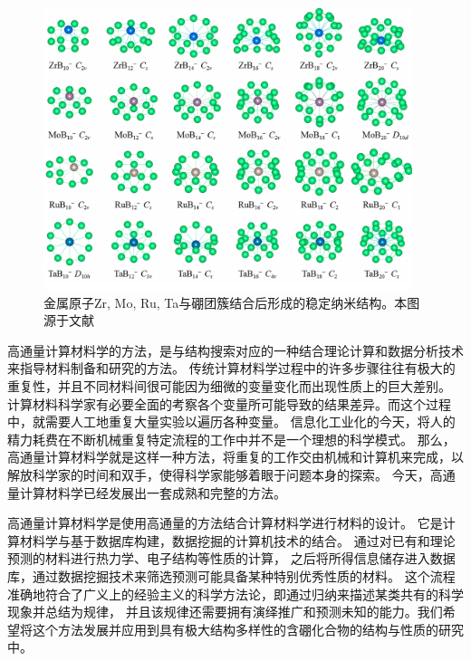 \begin{figure}[bt]
  \includegraphics[width=0.96\textwidth]{figs/ch1_boron_cluster02.png}
  \centering
  \caption{金属原子Zr, Mo, Ru, Ta与硼团簇结合后形成的稳定纳米结构。本图源于文献\cite{tian2019cluster}}
  \label{fig:ch1_boron_cluster02}
\end{figure}

高通量计算材料学的方法，是与结构搜索对应的一种结合理论计算和数据分析技术来指导材料制备和研究的方法。
传统计算材料学过程中的许多步骤往往有极大的重复性，并且不同材料间很可能因为细微的变量变化而出现性质上的巨大差别。
计算材料科学家有必要全面的考察各个变量所可能导致的结果差异。而这个过程中，就需要人工地重复大量实验以遍历各种变量。
信息化工业化的今天，将人的精力耗费在不断机械重复特定流程的工作中并不是一个理想的科学模式。
那么，高通量计算材料学就是这样一种方法，将重复的工作交由机械和计算机来完成，以解放科学家的时间和双手，使得科学家能够着眼于问题本身的探索。
今天，高通量计算材料学已经发展出一套成熟和完整的方法\cite{curtarolo2003predicting, ceder1998identification, curtarolo2005accuracy}。

高通量计算材料学是使用高通量的方法结合计算材料学进行材料的设计。
它是计算材料学与基于数据库构建，数据挖掘的计算机技术的结合。
通过对已有和理论预测的材料进行热力学、电子结构等性质的计算，
之后将所得信息储存进入数据库，通过数据挖掘技术来筛选预测可能具备某种特别优秀性质的材料。
这个流程准确地符合了广义上的经验主义的科学方法论，即通过归纳来描述某类共有的科学现象并总结为规律，
并且该规律还需要拥有演绎推广和预测未知的能力。我们希望将这个方法发展并应用到具有极大结构多样性的含硼化合物的结构与性质的研究中。

